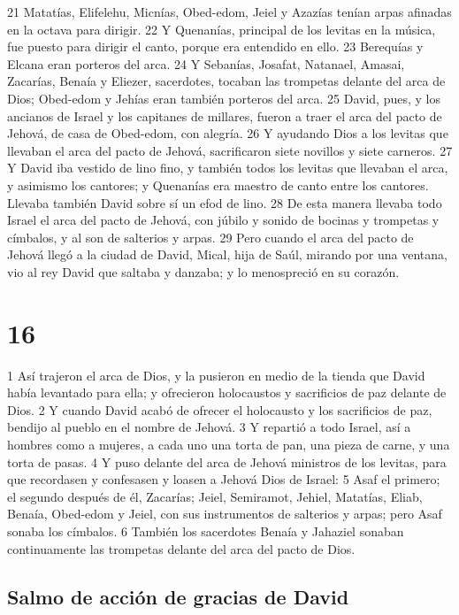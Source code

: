 21 Matatías, Elifelehu, Micnías, Obed-edom, Jeiel y Azazías tenían arpas afinadas en la octava para dirigir.
22 Y Quenanías, principal de los levitas en la música, fue puesto para dirigir el canto, porque era entendido en ello.
23 Berequías y Elcana eran porteros del arca.
24 Y Sebanías, Josafat, Natanael, Amasai, Zacarías, Benaía y Eliezer, sacerdotes, tocaban las trompetas delante del arca de Dios; Obed-edom y Jehías eran también porteros del arca.
25 David, pues, y los ancianos de Israel y los capitanes de millares, fueron a traer el arca del pacto de Jehová, de casa de Obed-edom, con alegría.
26 Y ayudando Dios a los levitas que llevaban el arca del pacto de Jehová, sacrificaron siete novillos y siete carneros.
27 Y David iba vestido de lino fino, y también todos los levitas que llevaban el arca, y asimismo los cantores; y Quenanías era maestro de canto entre los cantores. Llevaba también David sobre sí un efod de lino.
28 De esta manera llevaba todo Israel el arca del pacto de Jehová, con júbilo y sonido de bocinas y trompetas y címbalos, y al son de salterios y arpas.
29 Pero cuando el arca del pacto de Jehová llegó a la ciudad de David, Mical, hija de Saúl, mirando por una ventana, vio al rey David que saltaba y danzaba; y lo menospreció en su corazón.

\chapter{16}


1 Así trajeron el arca de Dios, y la pusieron en medio de la tienda que David había levantado para ella; y ofrecieron holocaustos y sacrificios de paz delante de Dios.
2 Y cuando David acabó de ofrecer el holocausto y los sacrificios de paz, bendijo al pueblo en el nombre de Jehová.
3 Y repartió a todo Israel, así a hombres como a mujeres, a cada uno una torta de pan, una pieza de carne, y una torta de pasas.
4 Y puso delante del arca de Jehová ministros de los levitas, para que recordasen y confesasen y loasen a Jehová Dios de Israel:
5 Asaf el primero; el segundo después de él, Zacarías; Jeiel, Semiramot, Jehiel, Matatías, Eliab, Benaía, Obed-edom y Jeiel, con sus instrumentos de salterios y arpas; pero Asaf sonaba los címbalos.
6 También los sacerdotes Benaía y Jahaziel sonaban continuamente las trompetas delante del arca del pacto de Dios.
\section*{Salmo de acción de gracias de David }


